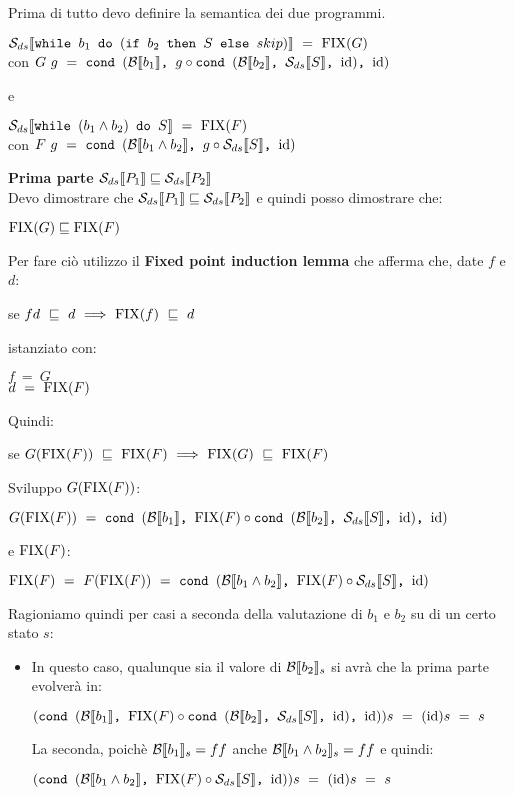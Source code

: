 {
    Prima di tutto devo definire la semantica dei due programmi.\\
    \begin{center}
    $\dsCtxt{$\exEightA{}$}~=~\fixp{G}$ \\con 
    $G~g~=~\cond{b_1}{g \circ \cond{b_2}{\Sds}{\idDS}}{\idDS}$
    \end{center}
    e
    \begin{center}
    $\dsCtxt{$\exEightB{}$}~=~\fixp{F}$ \\con 
    $F~g~=~\cond{b_1\and{}b_2}{g \circ \Sds}{\idDS}$
    \end{center}
    
    \textbf{Prima parte $\dsCtxt{P_1} \mineq \dsCtxt{P_2}$}\\
    Devo dimostrare che $\dsCtxt{P_1} \mineq \dsCtxt{P_2}$ e quindi posso
    dimostrare che:
    \begin{center}
    $\fixp{G} \mineq \fixp{F}$
    \end{center}
    Per fare ciò utilizzo il \textbf{Fixed point induction lemma} che afferma
    che, date $f$ e $d$:
    \begin{center}
    se $fd~\mineq~d~\Longrightarrow~\fixp{f}~\mineq~d$
    \end{center}
    istanziato con:
    \begin{center}
    $f~=~G$ \\
    $d~=~\fixp{F}$
    \end{center}
    Quindi:
    \begin{center}
    se $G(\fixp{F})~\mineq~\fixp{F}~\Longrightarrow~\fixp{G}~\mineq~\fixp{F}$
    \end{center}
    Sviluppo $G(\fixp{F})$:
    \begin{center}
    $G(\fixp{F})~=~\cond{b_1}{\fixp{F} \circ \cond{b_2}{\Sds}{\idDS}}{\idDS}$
    \end{center}
    e $\fixp{F}$:
    \begin{center}
    $\fixp{F}~=~F(\fixp{F})~=~\cond{b_1\and{}b_2}{\fixp{F} \circ \Sds}{\idDS}$
    \end{center}
    Ragioniamo quindi per casi a seconda della valutazione di $b_1$ e $b_2$ su
    di un certo stato $s$:
    \begin{itemize}
        \item {} In questo caso, qualunque sia il
        valore di $\evalBbs{b_2}{s}$ si avrà che la prima parte evolverà in:
        \begin{center}
        $(\cond{b_1}{\fixp{F} \circ \cond{b_2}{\Sds}{\idDS}}{\idDS})s~=~(\idDS)s
        ~=~s$
        \end{center}
        La seconda, poichè $\evalBbs{b_1}{s}=ff$ anche
        $\evalBbs{b_1\and{}b_2}{s}=ff$ e quindi:
        \begin{center}
        $(\cond{b_1\and{}b_2}{\fixp{F} \circ \Sds}{\idDS})s~=~(\idDS)s~=~s$
        \end{center}


\end{itemize}}
